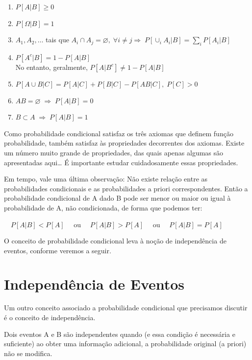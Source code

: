 \documentclass[
]{book}
\theoremstyle{definition}
\theoremstyle{definition}
\theoremstyle{definition}
\theoremstyle{remark}
\begin{document}
\begin{enumerate}
\def\labelenumi{(\arabic{enumi})}
\item
  \(P[A|B] \geq 0\)
\item
  \(P[\Omega|B] = 1\)
\item
  \(A_1, A_2, \ldots\) tais que \(A_i \cap A_j = \varnothing, \; \forall i\neq j \Rightarrow \; P[\cup_i A_i |B] = \sum_i P[A_i|B]\)
\item
  \(P[A^c|B] = 1 - P[A|B]\) \\
  No entanto, geralmente, \(P[A|B^c] \neq 1 - P[A|B]\)
\item
  \(P[A \cup B|C] = P[A|C] + P[B|C] - P[A B|C], \; P[C]>0\)
\item
  \(AB = \varnothing \; \Rightarrow \; P[A|B] = 0\)
\item
  \(B \subset A \; \Rightarrow \; P[A|B] = 1\)
\end{enumerate}

Como probabilidade condicional satisfaz os três axiomas que definem função probabilidade,
também satisfaz às propriedades decorrentes dos axiomas. Existe um número muito grande de propriedades, das quais apenas algumas são apresentadas aqui\ldots{} É importante estudar cuidadosamente essas propriedades.

Em tempo, vale uma última observação: Não existe relação entre as probabilidades condicionais e as probabilidades a priori correspondentes. Então a probabilidade condicional de A dado B pode ser menor ou maior ou igual à probabilidade de A, não condicionada, de forma que podemos ter:

\(\quad P[A|B] < P[A] \quad\) ou \(\quad P[A|B] > P[A] \quad\) ou \(\quad P[A|B] = P[A]\)

O conceito de probabilidade condicional leva à noção de independência de eventos, conforme veremos a seguir.

\hypertarget{independuxeancia-de-eventos}{%
\section{Independência de Eventos}\label{independuxeancia-de-eventos}}

Um outro conceito associado a probabilidade condicional que precisamos discutir é o conceito de independência.

Dois eventos A e B são independentes quando (e essa condição é necessária e suficiente) ao obter uma informação adicional, a probabilidade original (a priori) não se modifica.
\end{document}
